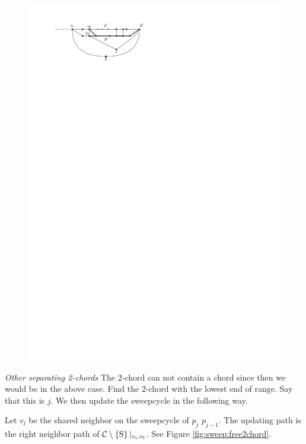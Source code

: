     \begin{figure}[h]
      \centering
      \includegraphics[scale=1]{unifiedAlgo/img/sweep/pEBound}
      \caption{}
      \label{fig:sweep:pEBound}
    \end{figure}
    \emph{Other separating 2-chords}
    The 2-chord can not contain a chord since then we would be in the above case.
    Find the $2$-chord with the lowest end of range. Say that this is $j$. We then update the sweepcycle in the following way.

    Let $v_l$ be the shared neighbor on the sweepcycle of $p_{j}$ $p_{j-1}$. The updating path is the right neighbor path of $\mathcal{C} \setminus \left\lbrace {\mathrm{S}} \right\rbrace|_{v_i, v_l}$. See Figure \ref{fig:sweep:free2chord}.

